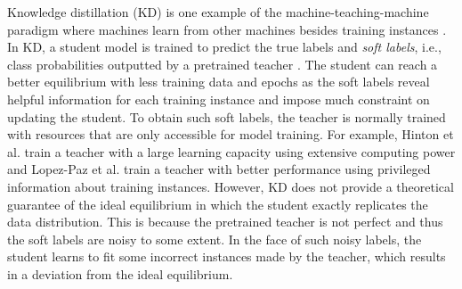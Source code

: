 \documentclass{article}
\begin{document}
Knowledge distillation (KD) is one example of the machine-teaching-machine paradigm \cite{lopez2015unifying} where machines learn from other machines besides training instances \cite{fouad2013incorporating,sharmanska2013learning}.
In KD, a student model is trained to predict the true labels and \emph{soft labels}, i.e., class probabilities outputted by a pretrained teacher \cite{hinton2015distilling}.
The student can reach a better equilibrium with less training data and epochs as the soft labels reveal helpful information for each training instance and impose much constraint on updating the student.
To obtain such soft labels, the teacher is normally trained with resources that are only accessible for model training.
For example, Hinton et al. \cite{hinton2015distilling} train a teacher with a large learning capacity using extensive computing power and Lopez-Paz et al. \cite{lopez2015unifying} train a teacher with better performance using privileged information about training instances.
However, KD does not provide a theoretical guarantee of the ideal equilibrium in which the student exactly replicates the data distribution.
This is because the pretrained teacher is not perfect and thus the soft labels are noisy to some extent.
In the face of such noisy labels, the student learns to fit some incorrect instances made by the teacher, which results in a deviation from the ideal equilibrium.
\end{document}
